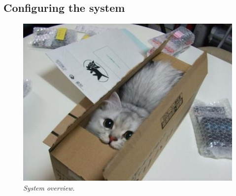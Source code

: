\subsection{Configuring the system}

\begin{figure}[htb]
	\centering
	\includegraphics[width=\linewidth]{images/boxcat.jpg}
	\caption[Overview of the entire system]{\textit{System overview.}}
	\label{fig:system_overview}  %
\end{figure}

